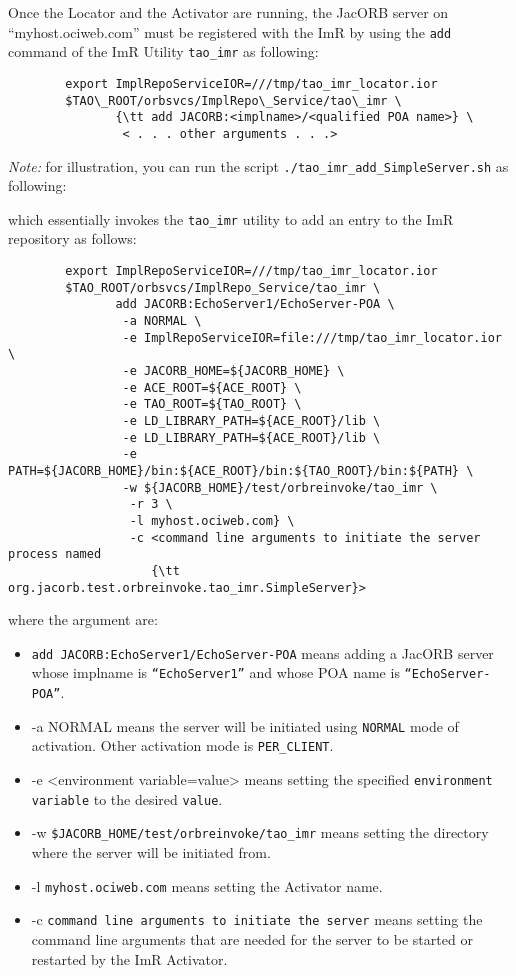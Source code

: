 Once the Locator and the Activator are running, the JacORB server on
“myhost.ociweb.com” must be registered with the ImR by using the
{\tt add} command of the ImR Utility {\tt tao\_imr} as following:

\begin{verbatim}
        export ImplRepoServiceIOR=///tmp/tao_imr_locator.ior
        $TAO\_ROOT/orbsvcs/ImplRepo\_Service/tao\_imr \
               {\tt add JACORB:<implname>/<qualified POA name>} \
                < . . . other arguments . . .>
\end{verbatim}

\emph{Note:} for illustration, you can run the script
{\tt ./tao\_imr\_add\_SimpleServer.sh} as following:


which essentially invokes the {\tt tao\_imr} utility to add an entry to
the ImR repository as follows:

\begin{verbatim}
        export ImplRepoServiceIOR=///tmp/tao_imr_locator.ior
        $TAO_ROOT/orbsvcs/ImplRepo_Service/tao_imr \
               add JACORB:EchoServer1/EchoServer-POA \
                -a NORMAL \
                -e ImplRepoServiceIOR=file:///tmp/tao_imr_locator.ior \
                -e JACORB_HOME=${JACORB_HOME} \
                -e ACE_ROOT=${ACE_ROOT} \
                -e TAO_ROOT=${TAO_ROOT} \
                -e LD_LIBRARY_PATH=${ACE_ROOT}/lib \
                -e LD_LIBRARY_PATH=${ACE_ROOT}/lib \
                -e PATH=${JACORB_HOME}/bin:${ACE_ROOT}/bin:${TAO_ROOT}/bin:${PATH} \
                -w ${JACORB_HOME}/test/orbreinvoke/tao_imr \
                 -r 3 \
                 -l myhost.ociweb.com} \
                 -c <command line arguments to initiate the server process named
                    {\tt org.jacorb.test.orbreinvoke.tao_imr.SimpleServer}>
\end{verbatim}

where the argument are:
\begin{itemize}
    \item {\tt add JACORB:EchoServer1/EchoServer-POA} means
             adding a JacORB server whose implname is {\tt “EchoServer1”}
             and whose POA name is {\tt “EchoServer-POA”}.
    \item -a NORMAL means the server will be initiated using
             {\tt NORMAL} mode of activation.  Other activation mode
              is {\tt PER\_CLIENT}.
    \item -e <environment variable=value> means setting the specified
              {\tt environment variable} to the desired {\tt value}.
    \item -w {\tt \${JACORB\_HOME}/test/orbreinvoke/tao\_imr} means setting
               the directory where the server will be initiated from.
    \item -l {\tt myhost.ociweb.com} means setting the Activator name.
    \item -c {\tt command line arguments to initiate the server} means
               setting the command line arguments that are needed for the server
               to be started or restarted by the ImR Activator.
\end{itemize}

